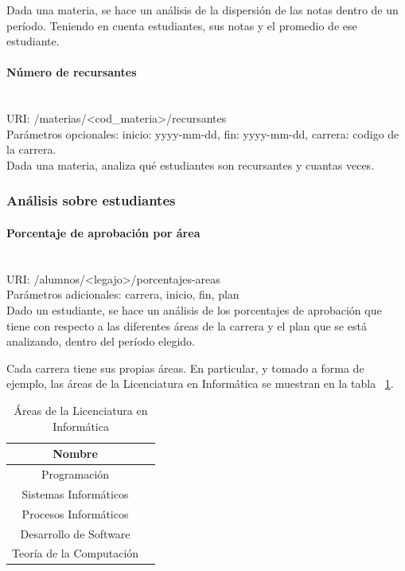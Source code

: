 Dada una materia, se hace un análisis de la dispersión de las notas dentro de un período. Teniendo en cuenta estudiantes, sus notas y el promedio de ese estudiante.

\paragraph{Número de recursantes}\mbox{}\\

URI: /materias/<cod\_materia>/recursantes \\

Parámetros opcionales: inicio: yyyy-mm-dd, fin: yyyy-mm-dd, carrera: codigo de la carrera. \\

Dada una materia, analiza qué estudiantes son recursantes y cuantas veces.


\subsubsection{Análisis sobre estudiantes}

\paragraph{Porcentaje de aprobación por área}\mbox{}\\

URI: /alumnos/<legajo>/porcentajes-areas \\

Parámetros adicionales: carrera, inicio, fin, plan \\

Dado un estudiante, se hace un análisis de los porcentajes de aprobación que tiene con respecto a las diferentes áreas de la carrera y el plan que se está analizando, dentro del período elegido.

Cada carrera tiene sus propias áreas. En particular, y tomado a forma de ejemplo, las áreas de la Licenciatura en Informática se muestran en la tabla ~\ref{tab:tabla_areas}.

\begin{table}[!htbp]
    \centering
    \makegapedcells
    \begin{tabular}{|c|c|}
    \hline
    Nombre \\ \hline
    Programación \\ \hline
    Sistemas Informáticos \\ \hline
    Procesos Informáticos\\ \hline
    Desarrollo de Software \\ \hline
    Teoría de la Computación \\ \hline
    \end{tabular}
    \caption{Áreas de la Licenciatura en Informática}
    \label{tab:tabla_areas}
\end{table}

